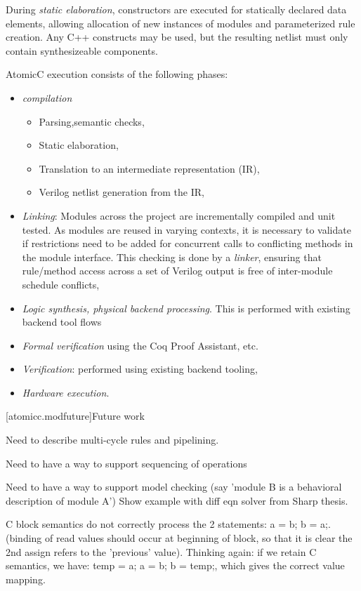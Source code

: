 During \textit{static elaboration},
constructors are executed for statically declared data elements,
allowing allocation of new instances of modules and parameterized rule creation.
Any C++ constructs may be used, but
the resulting netlist must only contain synthesizeable components.

AtomicC execution consists of the following phases:
\begin{itemize}
\item \textit{compilation}
\begin{itemize}
\item {Parsing,semantic checks},
\item {Static elaboration},
\item {Translation to an intermediate representation (IR)},
\item {Verilog netlist generation from the IR},
\end{itemize}
\item \textit{Linking}: Modules across the project are incrementally compiled
and unit tested.  As modules are reused in varying contexts, it is necessary
to validate if restrictions need to be added for concurrent calls to conflicting
methods in the module interface.
This checking is done by a \textit{linker},  ensuring that rule/method access
across a set of Verilog output is free of inter-module schedule conflicts,
\item \textit{Logic synthesis, physical backend processing}.  This is performed
with existing backend tool flows
\item \textit{Formal verification} using the Coq Proof Assistant, etc.
\item \textit{Verification}: performed using existing backend tooling,
\item \textit{Hardware execution}.
\end{itemize}


[atomicc.modfuture]{Future work}

Need to describe multi-cycle rules and pipelining.

Need to have a way to support sequencing of operations

Need to have a way to support model checking (say 'module B is a behavioral description of module A')
Show example with diff eqn solver from Sharp thesis.

C block semantics do not correctly process the 2 statements: a = b; b = a;.
(binding of read values should occur at beginning of block, so that it is clear the
2nd assign refers to the 'previous' value).
Thinking again: if we retain C semantics, we have: temp = a; a = b; b = temp;, which
gives the correct value mapping.

